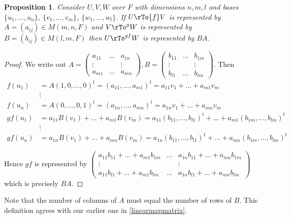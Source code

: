 \documentclass[12pt]{amsart}
\newtheorem{proposition}[theorem]{Proposition}
\theoremstyle{definition}
\begin{document}
\begin{proposition} Consider $U, V, W$ over $F$ with dimensions $n, m, l$ and bases $\{u_1, \dots , u_n\}$, $\{v_1, \dots, v_m\}$, $\{w_1, \dots, w_l\}$. If $U \rTo{f} V$ is represented by $A = (a_{ij}) \in M(m, n,F)$ and $V \rTo^{g} W$ is represented by $B = (b_{ij}) \in M(l, m, F)$ then $U \rTo^{gf} W$ is represented by $BA$.
\end{proposition}
\begin{proof} We write out $A = \left(\begin{array}{ccc} a_{11} & \dots & a_{1n} \\ \vdots & & \vdots \\ a_{m1} & \dots & a_{mn} \end{array}\right), B = \left(\begin{array}{ccc} b_{11} & \dots & b_{1m} \\ \vdots & & \vdots \\ b_{l1} & \dots & b_{lm} \end{array}\right)$. Then
\begin{align*}
f(u_1) & = A(1,0, \dots , 0)^t = (a_{11}, \dots , a_{m1})^t = a_{11}v_1 + \ldots + a_{m1}v_m \\
 & \vdots \\
f(u_n) & = A(0, \dots , 0, 1)^t = (a_{1n}, \dots , a_{mn})^t = a_{1n}v_1 + \ldots + a_{mn}v_m \\
gf(u_1) & = a_{11}B(v_1) + \ldots + a_{m1}B(v_m) = a_{11}(b_{11}, \dots , b_{l1})^t + \ldots + a_{m1}(b_{1m}, \dots , b_{lm})^t \\
 & \vdots \\
gf(u_n) & = a_{1n}B(v_1) + \ldots + a_{mn}B(v_m) = a_{1n}(b_{11}, \dots , b_{l1})^t + \ldots + a_{mn}(b_{1m}, \dots , b_{lm})^t
\end{align*}

Hence $gf$ is represented by $\left(\begin{array}{ccc} a_{11}b_{11} + \ldots + a_{m1}b_{1m} & \dots & a_{1n}b_{11} + \ldots + a_{mn}b_{1m} \\ \vdots & & \vdots \\ a_{11}b_{l1} + \ldots + a_{m1}b_{lm} & \dots & a_{1n}b_{l1} + \ldots + a_{mn}b_{lm} \end{array}\right)$ which is precisely $BA$.
\end{proof}

Note that the number of columns of $A$ must equal the number of rows of $B$. This definition agrees with our earlier one in \ref{linearmapmatrix}.
\end{document}
